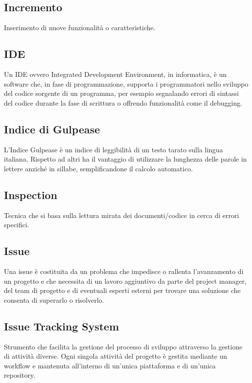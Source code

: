 
\subsection*{Incremento}
Inserimento di nuove funzionalità o caratteristiche.

\subsection*{IDE}
Un IDE ovvero Integrated Development Environment, in informatica, è un software che, in fase di programmazione, supporta i programmatori nello sviluppo del codice sorgente di un programma, per esempio segnalando errori di sintassi del codice durante la fase di scrittura o offrendo funzionalità come il debugging.

\subsection*{Indice di Gulpease}
L'Indice Gulpease è un indice di leggibilità di un testo tarato sulla lingua italiana. Rispetto ad altri ha il vantaggio di utilizzare la lunghezza delle parole in lettere anziché in sillabe, semplificandone il calcolo automatico.

\subsection*{Inspection}
Tecnica che si basa sulla lettura mirata dei documenti/codice in cerca di errori specifici.

\subsection*{Issue}
Una issue è costituita da un problema che impedisce o rallenta l’avanzamento di un progetto e che necessita di un lavoro aggiuntivo da parte del project manager, del team di progetto e di eventuali esperti esterni per trovare una soluzione che consenta di superarlo o risolverlo.

\subsection*{Issue Tracking System}
Strumento che facilita la gestione del processo di sviluppo attraverso la gestione di attività diverse.
Ogni singola attività del progetto è gestita mediante un workflow e mantenuta all’interno di un’unica piattaforma e di un’unica repository.

